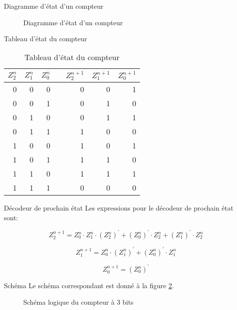 \documentclass[presentation]{beamer}
\begin{document}
\begin{frame}[label={sec:orgadf126b}]{Diagramme d'état d'un compteur}
\begin{figure}[htbp]
\centering

\caption{\label{fig:org3a1d280}Diagramme d'état d'un compteur}
\end{figure}
\end{frame}

\begin{frame}[label={sec:org448dbf0}]{Tableau d'état du compteur}
\begin{table}[htbp]
\caption{\label{tab:org90de155}Tableau d'état du compteur}
\centering
\begin{tabular}{rrrlrrr}
\(Z_2^n\) & \(Z_1^n\) & \(Z_0^n\) &  & \(Z_2^{n+1}\) & \(Z_1^{n+1}\) & \(Z_0^{n+1}\)\\
\hline
0 & 0 & 0 &  & 0 & 0 & 1\\
0 & 0 & 1 &  & 0 & 1 & 0\\
0 & 1 & 0 &  & 0 & 1 & 1\\
0 & 1 & 1 &  & 1 & 0 & 0\\
1 & 0 & 0 &  & 1 & 0 & 1\\
1 & 0 & 1 &  & 1 & 1 & 0\\
1 & 1 & 0 &  & 1 & 1 & 1\\
1 & 1 & 1 &  & 0 & 0 & 0\\
\end{tabular}
\end{table}
\end{frame}

\begin{frame}[label={sec:org418c083}]{Décodeur de prochain état}
Les expressions pour le décodeur de prochain état sont: 

$$  Z_2^{n+1} = Z_0^n \cdot Z_1^n \cdot (Z_2^{n})^\prime + (Z_0^{n})^\prime \cdot Z_2^n + (Z_1^{n})^\prime \cdot Z_2^n $$

$$  Z_1^{n+1} = Z_0^{n} \cdot (Z_1^{n})^\prime + (Z_0^{n})^\prime \cdot Z_1^n $$

$$  Z_0^{n+1} = (Z_0^{n})^\prime $$
\end{frame}

\begin{frame}[label={sec:orgca3a270}]{Schéma}
Le schéma correspondant est donné à la figure \ref{fig:orgffed1bd}.

\begin{figure}[htbp]
\centering

\caption{\label{fig:orgffed1bd}Schéma logique du compteur à 3 bits}
\end{figure}
\end{frame}
\end{document}
